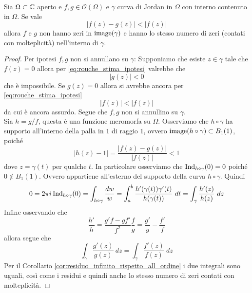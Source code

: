 \begin{theorem}
   \label{thr:rouche}
  Sia $\Omega \subset \mathbb{C}$ aperto e $f,g \in \mathcal{O}(\Omega)$ e $\gamma$
  curva di Jordan in $\Omega$ con interno contenuto in $\Omega$. Se vale 
  \begin{equation}
    \label{eq:rouche_stima_ipotesi}
    |f(z) - g(z)| < |f(z)|
  \end{equation}
  allora $f$ e $g$ non hanno zeri in $\operatorname{image}(\gamma)$ e hanno lo stesso numero
  di zeri (contati con molteplicità) nell'interno di $\gamma$.
 
\end{theorem}
\begin{proof}
  Per ipotesi $f,g$ non si annullano su $\gamma$:
  Supponiamo che esiste $z \in \gamma$ tale che $f(z) = 0$ allora per
  \eqref{eq:rouche_stima_ipotesi} valrebbe che 
  \begin{equation*}
    |g(z)| < 0
  \end{equation*}
  che è impossibile. Se $g(z) = 0$ allora si avrebbe ancora per
  \eqref{eq:rouche_stima_ipotesi}
  \begin{equation*}
    |f(z)| < |f(z)|
  \end{equation*}
  da cui è ancora assurdo. Segue che $f,g$ non si annullino su $\gamma$.\\

  Sia $h = g/f$, questa è una funzione meromorfa su $\Omega$. Osserviamo che $h
  \circ \gamma$ ha supporto all'interno della palla in $1$ di raggio $1$, ovvero
  $\operatorname{image}(h \circ \gamma) \subset B_1(1)$, poiché 
  \begin{equation*}
    |h(z) - 1| = \frac{|f(z) - g(z)|}{|f(z)|} < 1
  \end{equation*}
  dove $z = \gamma(t)$ per qualche $t$. In particolare osserviamo che
  $\operatorname{Ind}_{h\circ \gamma}(0) = 0$ poiché $0 \notin B_1(1)$. Ovvero appartiene
  all'esterno del supporto della curva $h \circ \gamma$. Quindi
  \begin{equation*}
    0 = 2\pi i \operatorname{Ind}_{h\circ \gamma}(0) = \int_{h \circ \gamma}
    \frac{dw}{w} = \int_{a}^b \frac{h'(\gamma(t))\gamma'(t)}{h(\gamma(t))}\ dt
    = \int_{\gamma} \frac{h'(z)}{h(z)}\ dz
  \end{equation*}
  Infine osservando che 
  \begin{equation*}
    \frac{h'}{h} = \frac{g'f - gf'}{f^2} \frac{f}{g} = \frac{g'}{g}
    - \frac{f'}{f}
  \end{equation*}
  allora segue che 
  \begin{equation*}
    \int_{\gamma} \frac{g'(z)}{g(z)}\ dz = \int_{\gamma} \frac{f'(z)}{f(z)}\ dz
  \end{equation*}
  Per il Corollario \ref{cor:residuo_infinito_rispetto_all_ordine} i due
  integrali sono uguali, così come i residui e quindi anche lo stesso numero di
  zeri contati con molteplicità.
\end{proof}


